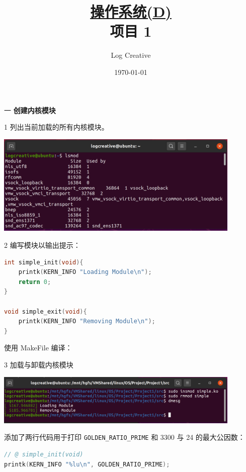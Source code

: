 \documentclass[12pt,a4paper]{article}
\newenvironment{problems}{\begin{list}{}{\renewcommand{\makelabel}[1]{\textbf{##1}\hfil}}}{\end{list}}
\newenvironment{steps}{\begin{list}{}{\renewcommand{\makelabel}[1]{##1.\hfil}}}{\end{list}}
\providecommand{\code}[2]{}
\begin{document}
\title{\normalsize \underline{操作系统(D)}\\\LARGE 项目 1}
\author{Log Creative }
\date{\today}
\maketitle

\begin{problems}
    \item[一] \textbf{创建内核模块}
    \begin{steps}
        \item[1] 列出当前加载的所有内核模块。
        
        \includegraphics[width=0.88\textwidth]{lsmod.png}

        \item[2] 编写模块以输出提示：

        \begin{lstlisting}[language=c]
int simple_init(void){
    printk(KERN_INFO "Loading Module\n");
    return 0;
}

void simple_exit(void){
    printk(KERN_INFO "Removing Module\n");
}
        \end{lstlisting}

        使用 MakeFile 编译：
        \code{src/Makefile}{}

        \item[3] 加载与卸载内核模块
        
        \includegraphics[width=0.88\textwidth]{insmod.png}

        添加了两行代码用于打印 \texttt{GOLDEN\_RATIO\_PRIME} 和 3300 与 24 的最大公因数：

        \begin{lstlisting}[language=c]
// @ simple_init(void)
printk(KERN_INFO "%lu\n", GOLDEN_RATIO_PRIME);


\end{lstlisting}
\end{steps}
\end{problems}
\end{document}
